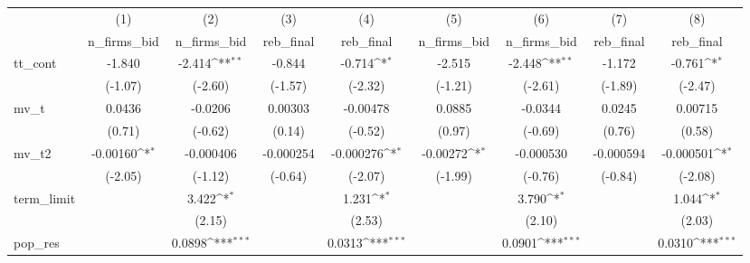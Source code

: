 {
\def\sym#1{\ifmmode^{#1}\else\(^{#1}\)\fi}
\begin{tabular}{l*{8}{c}}
\hline\hline
            &\multicolumn{1}{c}{(1)}&\multicolumn{1}{c}{(2)}&\multicolumn{1}{c}{(3)}&\multicolumn{1}{c}{(4)}&\multicolumn{1}{c}{(5)}&\multicolumn{1}{c}{(6)}&\multicolumn{1}{c}{(7)}&\multicolumn{1}{c}{(8)}\\
            &\multicolumn{1}{c}{n\_firms\_bid}&\multicolumn{1}{c}{n\_firms\_bid}&\multicolumn{1}{c}{reb\_final}&\multicolumn{1}{c}{reb\_final}&\multicolumn{1}{c}{n\_firms\_bid}&\multicolumn{1}{c}{n\_firms\_bid}&\multicolumn{1}{c}{reb\_final}&\multicolumn{1}{c}{reb\_final}\\
\hline
tt\_cont     &      -1.840         &      -2.414\sym{**} &      -0.844         &      -0.714\sym{*}  &      -2.515         &      -2.448\sym{**} &      -1.172         &      -0.761\sym{*}  \\
            &     (-1.07)         &     (-2.60)         &     (-1.57)         &     (-2.32)         &     (-1.21)         &     (-2.61)         &     (-1.89)         &     (-2.47)         \\
[1em]
mv\_t        &      0.0436         &     -0.0206         &     0.00303         &    -0.00478         &      0.0885         &     -0.0344         &      0.0245         &     0.00715         \\
            &      (0.71)         &     (-0.62)         &      (0.14)         &     (-0.52)         &      (0.97)         &     (-0.69)         &      (0.76)         &      (0.58)         \\
[1em]
mv\_t2       &    -0.00160\sym{*}  &   -0.000406         &   -0.000254         &   -0.000276\sym{*}  &    -0.00272\sym{*}  &   -0.000530         &   -0.000594         &   -0.000501\sym{*}  \\
            &     (-2.05)         &     (-1.12)         &     (-0.64)         &     (-2.07)         &     (-1.99)         &     (-0.76)         &     (-0.84)         &     (-2.08)         \\
[1em]
term\_limit  &                     &       3.422\sym{*}  &                     &       1.231\sym{*}  &                     &       3.790\sym{*}  &                     &       1.044\sym{*}  \\
            &                     &      (2.15)         &                     &      (2.53)         &                     &      (2.10)         &                     &      (2.03)         \\
[1em]
pop\_res     &                     &      0.0898\sym{***}&                     &      0.0313\sym{***}&                     &      0.0901\sym{***}&                     &      0.0310\sym{***}\\

\end{tabular}}
